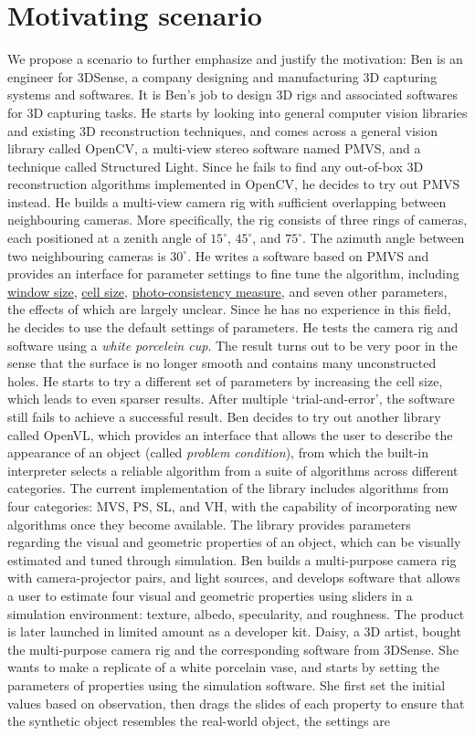 \section{Motivating scenario}
We propose a scenario to further emphasize and justify the motivation: Ben is an engineer for 3DSense, a company designing and manufacturing 3D capturing systems and softwares. It is Ben's job to design 3D rigs and associated softwares for 3D capturing tasks. He starts by looking into general computer vision libraries and existing 3D reconstruction techniques, and comes across a general vision library called OpenCV, a multi-view stereo software named PMVS, and a technique called Structured Light. Since he fails to find any out-of-box 3D reconstruction algorithms implemented in OpenCV, he decides to try out PMVS instead. He builds a multi-view camera rig with sufficient overlapping between neighbouring cameras. More specifically, the rig consists of three rings of cameras, each positioned at a zenith angle of $15^\circ$, $45^\circ$, and $75^\circ$. The azimuth angle between two neighbouring cameras is $30^\circ$. He writes a software based on PMVS and provides an interface for parameter settings to fine tune the algorithm, including \underline{window size}, \underline{cell size}, \underline{photo-consistency measure}, and seven other parameters, the effects of which are largely unclear. Since he has no experience in this field, he decides to use the default settings of parameters. He tests the camera rig and software using a \textit{white porcelein cup}. The result turns out to be very poor in the sense that the surface is no longer smooth and contains many unconstructed holes. He starts to try a different set of parameters by increasing the cell size, which leads to even sparser results. After multiple `trial-and-error', the software still fails to achieve a successful result. Ben decides to try out another library called OpenVL, which provides an interface that allows the user to describe the appearance of an object (called \textit{problem condition}), from which the built-in interpreter selects a reliable algorithm from a suite of algorithms across different categories. The current implementation of the library includes algorithms from four categories: MVS, PS, SL, and VH, with the capability of incorporating new algorithms once they become available. The library provides parameters regarding the visual and geometric properties of an object, which can be visually estimated and tuned through simulation. Ben builds a multi-purpose camera rig with camera-projector pairs, and light sources, and develops software that allows a user to estimate four visual and geometric properties using sliders in a simulation environment: texture, albedo, specularity, and roughness. The product is later launched in limited amount as a developer kit. Daisy, a 3D artist, bought the multi-purpose camera rig and the corresponding software from 3DSense. She wants to make a replicate of a white porcelain vase, and starts by setting the parameters of properties using the simulation software. She first set the initial values based on observation, then drags the slides of each property to ensure that the synthetic object resembles the real-world object, the settings are 